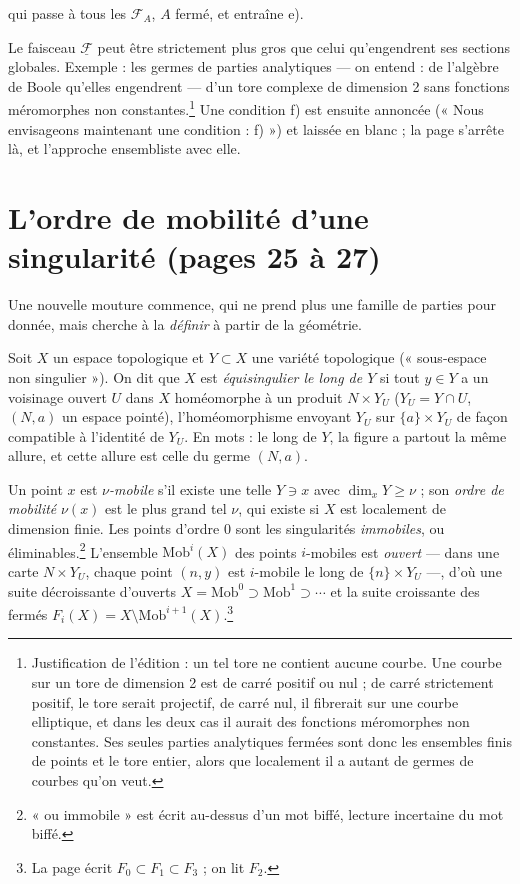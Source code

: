 \documentclass[11pt,a4paper]{article}
\begin{document}
qui passe à tous les $\mathcal{F}_A$, $A$ fermé, et entraîne e).

Le faisceau $\underline{\mathcal{F}}$ peut être strictement plus gros que celui
qu'engendrent ses sections globales. Exemple : les germes de parties
analytiques — on entend : de l'algèbre de Boole qu'elles engendrent — d'un tore
complexe de dimension 2 sans fonctions méromorphes non
constantes.\footnote{Justification de l'édition : un tel tore ne contient
aucune courbe. Une courbe sur un tore de dimension 2 est de carré positif ou
nul ; de carré strictement positif, le tore serait projectif, de carré nul, il
fibrerait sur une courbe elliptique, et dans les deux cas il aurait des
fonctions méromorphes non constantes. Ses
seules parties analytiques fermées sont donc les ensembles finis de points et
le tore entier, alors que localement il a autant de germes de courbes qu'on
veut.} Une condition f) est ensuite annoncée (« Nous envisageons maintenant une
condition : f) ») et laissée en blanc ; la page s'arrête là, et l'approche
ensembliste avec elle.

\section*{L'ordre de mobilité d'une singularité (pages 25 à 27)}

Une nouvelle mouture commence, qui ne prend plus une famille de parties pour
donnée, mais cherche à la \emph{définir} à partir de la géométrie.

Soit $X$ un espace topologique et $Y \subset X$ une variété topologique (« sous-espace
non singulier »). On dit que $X$ est \emph{équisingulier le long de $Y$} si
tout $y \in Y$ a un voisinage ouvert $U$ dans $X$ homéomorphe à un produit
$N \times Y_U$ ($Y_U = Y \cap U$, $(N, a)$ un espace pointé), l'homéomorphisme
envoyant $Y_U$ sur $\{a\} \times Y_U$ de façon compatible à l'identité de
$Y_U$. En mots : le long de $Y$, la figure a partout la même allure, et cette
allure est celle du germe $(N, a)$.

Un point $x$ est \emph{$\nu$-mobile} s'il existe une telle $Y \ni x$ avec
$\dim_x Y \geqslant \nu$ ; son \emph{ordre de mobilité} $\nu(x)$ est le plus
grand tel $\nu$, qui existe si $X$ est localement de dimension finie. Les
points d'ordre $0$ sont les singularités \emph{immobiles}, ou
éliminables.\footnote{« ou immobile » est écrit au-dessus d'un mot biffé,
lecture incertaine du mot biffé.} L'ensemble $\mathrm{Mob}^i(X)$ des points
$i$-mobiles est \emph{ouvert} — dans une carte $N \times Y_U$, chaque point
$(n, y)$ est $i$-mobile le long de $\{n\} \times Y_U$ —, d'où une suite
décroissante d'ouverts $X = \mathrm{Mob}^0 \supset \mathrm{Mob}^1 \supset
\cdots$ et la suite croissante des fermés $F_i(X) = X \setminus
\mathrm{Mob}^{i+1}(X)$.\footnote{La page écrit $F_0 \subset F_1 \subset F_3$ ;
on lit $F_2$.}
\end{document}
